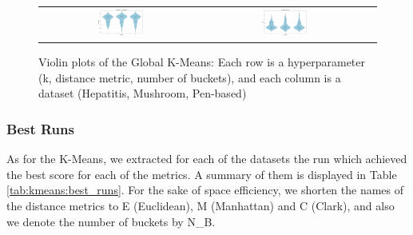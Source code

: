 \begin{figure}[h]
\begin{tabular}{ccc}
        \includegraphics[width=0.3\textwidth]{figures/GlobalKMeans/mushroom_violin_N_Buckets_vs_Silhouette.png} & 
        \includegraphics[width=0.3\textwidth]{figures/GlobalKMeans/penbased_violin_N_Buckets_vs_DBI.png} \\
    \end{tabular}
    \caption{Violin plots of the Global K-Means: Each row is a hyperparameter (k, distance metric, number of buckets), and each column is a dataset (Hepatitis, Mushroom, Pen-based)}
    \label{fig:globalkmeans:violin}
\end{figure}

\subsubsection{Best Runs}
As for the K-Means, we extracted for each of the datasets the run which achieved the best score for each of the metrics. A summary of them is displayed in Table \ref{tab:kmeans:best_runs}. For the sake of space efficiency, we shorten the names of the distance metrics to E (Euclidean), M (Manhattan) and C (Clark), and also we denote the number of buckets by N\_B.

